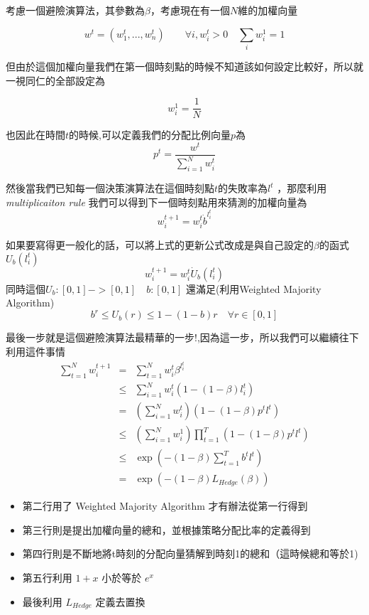 \documentclass[12pt]{report}
\numberwithin{equation}{section}
\begin{document}
\begin{CJK}{UTF8}{bsmi}
考慮一個避險演算法，其參數為$\beta$，考慮現在有一個$N$維的加權向量

\[ w^t = ( w_1^t, . . .  ,w_n^t ) \qquad \forall i, w_i^t >0 \quad \sum_i w_i^1 = 1 \]

但由於這個加權向量我們在第一個時刻點的時候不知道該如何設定比較好，所以就一視同仁的全部設定為 

\[ w_i^1 = \frac{1}{N} \]

也因此在時間$t$的時候,可以定義我們的分配比例向量$p$為
\[  p^t = \frac{w^t}{\sum^N_{i=1}w_i^t}  \]

然後當我們已知每一個決策演算法在這個時刻點$t$的失敗率為$l^t$ ，那麼利用\textit{multiplicaiton rule} 我們可以得到下一個時刻點用來猜測的加權向量為
\[ w_i^{t+1}= w_i^t \dot b^{l^t_i} \]

如果要寫得更一般化的話，可以將上式的更新公式改成是與自己設定的$\beta$的函式$U_b(l^t _i)$
\[ w_i^{t+1}= w_i^t \dot U_b(l^t_i) \]
同時這個$U_b :[0,1] -> [0,1] \quad b:[0,1]$ 還滿足(利用Weighted Majority Algorithm)
\[ b^r \leq U_b( r ) \leq 1-(1-b)r \quad  \forall r \in [0,1] \] 

最後一步就是這個避險演算法最精華的一步!,因為這一步，所以我們可以繼續往下利用這件事情
\begin{eqnarray*}
\sum_{t=1}^N w_i^{t+1}  & = &  \sum_{t=1}^N w_i^{t} \beta^{l^t_i} \\
					    & \leq &  \sum_{i=1}^N w_i^t(1-(1-\beta)l^t_i) \\
						&  = & (\sum_{i=1}^N w_i^t)(1-(1-\beta)p^tl^t) \\
						& \leq & (\sum_{i=1}^N w_i^1)\prod_{t=1}^T(1-(1-\beta)p^t l^t) \\
						& \leq & \exp(-(1-\beta)\sum_{t=1}^T b^t l^t) \\
						& = &  \exp(-(1-\beta)L_{Hedge}(\beta) ) 
\end{eqnarray*}

\begin{itemize}
\item 第二行用了 Weighted Majority Algorithm 才有辦法從第一行得到
\item 第三行則是提出加權向量的總和，並根據策略分配比率的定義得到
\item 第四行則是不斷地將t時刻的分配向量猜解到時刻1的總和（這時候總和等於1)
\item 第五行利用 $1 + x$ 小於等於 $e^x$   
\item 最後利用 $L_{Hedge}$  定義去置換
\end{itemize}




\end{CJK}
\end{document}
